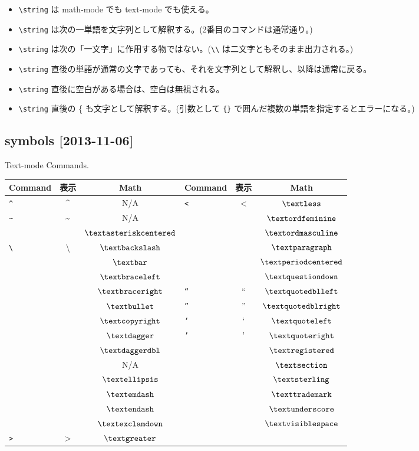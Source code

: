 \documentclass{jsarticle}
\begin{document}
\begin{itemize}
\item \verb+\string+ は math-mode でも text-mode でも使える。
\item \verb+\string+ は次の一単語を文字列として解釈する。(2番目のコマンドは通常通り。)
\item \verb+\string+ は次の「一文字」に作用する物ではない。(\verb+\\+ は二文字ともそのまま出力される。)
\item \verb+\string+ 直後の単語が通常の文字であっても、それを文字列として解釈し、以降は通常に戻る。
\item \verb+\string+ 直後に空白がある場合は、空白は無視される。
\item \verb+\string+ 直後の \{ も文字として解釈する。(引数として \verb+{}+ で囲んだ複数の単語を指定するとエラーになる。)
\end{itemize}

\subsection{{\tt\string\textfoobar} symbols [2013-11-06]}

\begin{center}
{Text-mode Commands.}
\newcommand{\cad}[1]{\texttt{\string#1}& #1 & N/A}
\newcommand{\cadd}[1]{\texttt{\string#1}& #1 & $#1$}
\begin{tabular}{ | lcc | lcc |}
\hline 
Command  & 表示 & Math & Command  & 表示 & Math\\
\hline
\cad{\textasciicircum}       & \cadd{\textless} \\ 
\cad{\textasciitilde}        & \cadd{\textordfeminine} \\ 
\cadd{\textasteriskcentered} & \cadd{\textordmasculine} \\ 
\cadd{\textbackslash}        & \cadd{\textparagraph} \\ 
\cadd{\textbar}              & \cadd{\textperiodcentered} \\ 
\cadd{\textbraceleft}        & \cadd{\textquestiondown} \\ 
\cadd{\textbraceright}       & \cadd{\textquotedblleft} \\ 
\cadd{\textbullet}           & \cadd{\textquotedblright} \\ 
\cadd{\textcopyright}        & \cadd{\textquoteleft} \\ 
\cadd{\textdagger}           & \cadd{\textquoteright} \\ 
\cadd{\textdaggerdbl}        & \cadd{\textregistered} \\ 
\cad{\textdollar}            & \cadd{\textsection} \\ 
\cadd{\textellipsis}         & \cadd{\textsterling} \\ 
\cadd{\textemdash}           & \cadd{\texttrademark} \\ 
\cadd{\textendash}           & \cadd{\textunderscore} \\ 
\cadd{\textexclamdown}       & \cadd{\textvisiblespace} \\ 
\cadd{\textgreater}&&\\
\hline
\end{tabular}
\end{center}
\end{document}
